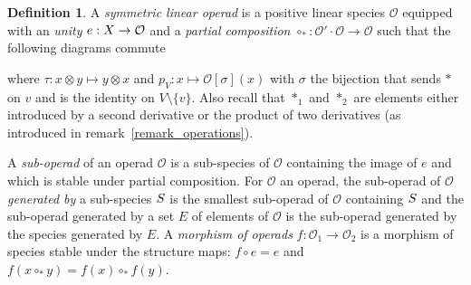 \documentclass[11pt]{article}
\theoremstyle{definition}
\newtheorem{defi}[theo]{Definition}
\numberwithin{equation}{section}
\newcommand{\spe}[1]{\normalfont{\textsc{#1}}}
\newcommand{\K}{\mathbb{K}}
\newcommand{\id}{Id}
\newcommand{\twist}{\tau}
\newcommand{\comp}[1][\ast]{\circ_{#1}}
\newcommand{\Operad}{\mathcal{O}}
\begin{document}
\begin{defi}
    A {\em symmetric linear operad} is a positive linear species $\Operad$ equipped with an {\em unity} 
    $e: \spe{X}\to \Operad$ and a  {\em partial composition} $\comp:\Operad'\cdot\Operad\to \Operad$ such
    that the following diagrams commute
    \begin{center}\label{def_op}
    \end{center}
    \begin{center}
    \end{center}
    where  $\tau:x\otimes y\mapsto y\otimes x$ and $p_V: x \mapsto \Operad[\sigma](x)$ with $\sigma$ the
    bijection that sends $\ast$ on $v$ and is the identity on $V\setminus\{v\}$. Also recall that $\ast_1$ and 
    $\ast_2$ are elements either introduced by a second derivative or the product of two derivatives (as introduced 
    in remark~\ref{remark_operations}).
\end{defi}


A {\em sub-operad} of an operad $\Operad$ is a sub-species of $\Operad$ containing the image of $e$ and 
which is stable under partial composition. For $\Operad$ an operad, the sub-operad of $\Operad$ 
{\em generated by} a sub-species $\spe{S}$ is the smallest sub-operad of $\Operad$ containing $\spe{S}$ and 
the sub-operad generated by a set $E$ of elements of $\Operad$ is the sub-operad generated by the species 
generated by $E$. A {\em morphism of operads} $f:\Operad_1\to\Operad_2$ is a morphism of species stable
under the structure maps: $f\circ e = e$ and $f(x\comp y) =f(x)\comp f(y)$.
\end{document}

